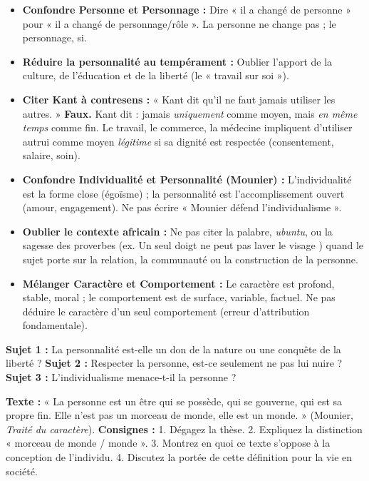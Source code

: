 \documentclass[11pt]{article}
\begin{document}
\begin{attention}
\begin{itemize}
\item \textbf{Confondre Personne et Personnage :} Dire « il a changé de personne » pour « il a changé de personnage/rôle ». La personne ne change pas ; le personnage, si.
\item \textbf{Réduire la personnalité au tempérament :} Oublier l'apport de la culture, de l'éducation et de la liberté (le « travail sur soi »).
\item \textbf{Citer Kant à contresens :} « Kant dit qu'il ne faut jamais utiliser les autres. » \textbf{Faux.} Kant dit : jamais \emph{uniquement} comme moyen, mais \emph{en même temps} comme fin. Le travail, le commerce, la médecine impliquent d'utiliser autrui comme moyen \emph{légitime} si sa dignité est respectée (consentement, salaire, soin).
\item \textbf{Confondre Individualité et Personnalité (Mounier) :} L'individualité est la forme close (égoïsme) ; la personnalité est l'accomplissement ouvert (amour, engagement). Ne pas écrire « Mounier défend l'individualisme ».
\item \textbf{Oublier le contexte africain :} Ne pas citer la palabre, \emph{ubuntu}, ou la sagesse des proverbes (ex. \guillemotleft Un seul doigt ne peut pas laver le visage \guillemotright) quand le sujet porte sur la relation, la communauté ou la construction de la personne.
\item \textbf{Mélanger Caractère et Comportement :} Le caractère est profond, stable, moral ; le comportement est de surface, variable, factuel. Ne pas déduire le caractère d'un seul comportement (erreur d'attribution fondamentale).
\end{itemize}
\end{attention}

\begin{exercice}
\textbf{Sujet 1 :} La personnalité est-elle un don de la nature ou une conquête de la liberté ?
\textbf{Sujet 2 :} Respecter la personne, est-ce seulement ne pas lui nuire ?
\textbf{Sujet 3 :} L'individualisme menace-t-il la personne ?
\end{exercice}

\begin{exercice}
\textbf{Texte :} « La personne est un être qui se possède, qui se gouverne, qui est sa propre fin. Elle n'est pas un morceau de monde, elle est un monde. » (Mounier, \emph{Traité du caractère}).
\textbf{Consignes :} 1. Dégagez la thèse. 2. Expliquez la distinction « morceau de monde / monde ». 3. Montrez en quoi ce texte s'oppose à la conception de l'individu. 4. Discutez la portée de cette définition pour la vie en société.
\end{exercice}
\end{document}
